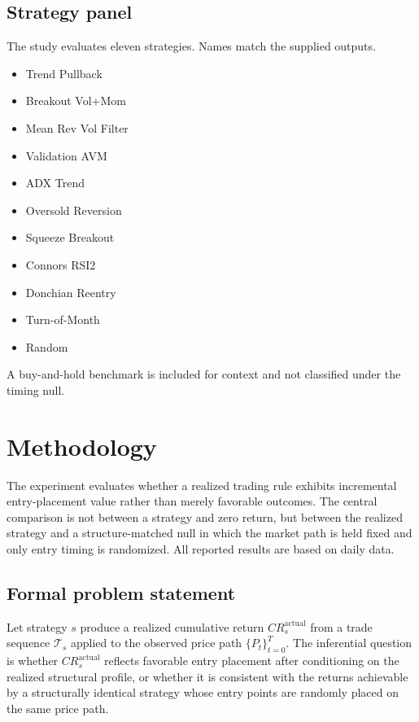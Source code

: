 \documentclass[preprint,12pt]{elsarticle}
\theoremstyle{definition}
\begin{document}
\subsection{Strategy panel}

The study evaluates eleven strategies. Names match the supplied outputs.

\begin{itemize}
\item Trend Pullback
\item Breakout Vol+Mom
\item Mean Rev Vol Filter
\item Validation AVM
\item ADX Trend
\item Oversold Reversion
\item Squeeze Breakout
\item Connors RSI2
\item Donchian Reentry
\item Turn-of-Month
\item Random
\end{itemize}

A buy-and-hold benchmark is included for context and not classified under the timing null.

\section{Methodology}

The experiment evaluates whether a realized trading rule exhibits incremental entry-placement value rather than merely favorable outcomes. The central comparison is not between a strategy and zero return, but between the realized strategy and a structure-matched null in which the market path is held fixed and only entry timing is randomized. All reported results are based on daily data.

\subsection{Formal problem statement}

Let strategy $s$ produce a realized cumulative return $CR_s^{\mathrm{actual}}$ from a trade sequence $\mathcal{T}_s$ applied to the observed price path $\{P_t\}_{t=0}^{T}$. The inferential question is whether $CR_s^{\mathrm{actual}}$ reflects favorable entry placement after conditioning on the realized structural profile, or whether it is consistent with the returns achievable by a structurally identical strategy whose entry points are randomly placed on the same price path.
\end{document}
